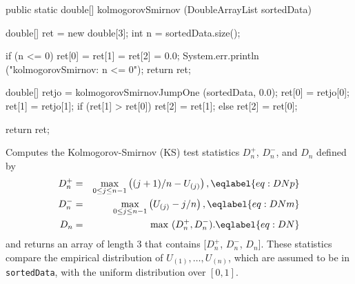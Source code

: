 \begin{code}

   public static double[] kolmogorovSmirnov (DoubleArrayList sortedData)\begin{hide} {
      double[] ret = new double[3];
      int n = sortedData.size();

      if (n <= 0) {
         ret[0] = ret[1] = ret[2] = 0.0;
         System.err.println ("kolmogorovSmirnov:   n <= 0");
         return ret;
      }

      double[] retjo = kolmogorovSmirnovJumpOne (sortedData, 0.0);
      ret[0] = retjo[0];
      ret[1] = retjo[1];
      if (ret[1] > ret[0])
         ret[2] = ret[1];
      else
         ret[2] = ret[0];

      return ret;
   }\end{hide}
\end{code}
\begin{tabb} Computes the Kolmogorov-Smirnov (KS) test statistics
 $D_n^+$, $D_n^-$, and $D_n$
 defined by
 \begin {eqnarray}
  D_n^+ &=& \max_{0\le j\le n-1} \left ((j+1)/n - U_{(j)}\right),
                                                    \eqlabel{eq:DNp} \\
  D_n^- &=& \max_{0\le j\le n-1} \left (U_{(j)} - j/n\right),
                                                    \eqlabel{eq:DNm} \\
  D_n   &=& \max\ (D_n^+, D_n^-).                   \eqlabel{eq:DN}
 \end {eqnarray}
 and returns an array of length 3 that contains [$D_n^+$, $D_n^-$, $D_n$].
 These statistics compare the empirical distribution of
 $U_{(1)},\dots,U_{(n)}$, which are assumed to be in \texttt{sortedData},
 with the uniform distribution over $[0,1]$.
\end{tabb}
\begin{htmlonly}
\end{htmlonly}
